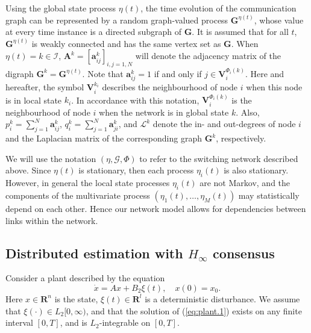 \documentclass[a4paper,twocolumn]{autart}
\begin{document}
Using the global state process $\eta(t)$, the time evolution of the
communication graph can be represented by a random graph-valued process
$\mathbf{G}^{\eta(t)}$, whose value at every time instance is a directed
subgraph of $\mathbf{G}$. It is assumed that for all $t$,
$\mathbf{G}^{\eta(t)}$ is weakly connected and has the same vertex set as
$\mathbf{G}$. When $\eta(t)=k\in\mathcal{I}$, 
$\mathbf{A}^k=[\mathbf{a}_{ij}^k]_{i,j=1,N}$ will denote the adjacency
matrix of the digraph $\mathbf{G}^k=\mathbf{G}^{\eta(t)}$. Note that
$\mathbf{a}_{ij}^k=1$ if and only if $j\in \mathbf{V}_i^{\Phi_i(k)}$. Here
and hereafter, the symbol $\mathbf{V}_i^{k_i}$ describes the neighbourhood
of node $i$ when this node is in local state $k_i$. In accordance with
this notation, $\mathbf{V}_i^{\Phi_i(k)}$ is the neighbourhood
of node $i$ when the network is in global state $k$. Also,  
$p_i^k=\sum_{j=1}^{N}\mathbf{a}_{ij}^k$, 
$q_i^k=\sum_{j=1}^{N}\mathbf{a}_{ji}^k$, and $\mathcal{L}^k$ denote the
in- and out-degrees of node $i$ and the Laplacian matrix of the
corresponding graph $\mathbf{G}^k$, respectively.    


We will use the notation $(\eta,\mathcal{G},\Phi)$ to refer to the
switching network described above. Since $\eta(t)$ is 
stationary, then each 
process $\eta_i(t)$ is also stationary. However, in general the local state
processes $\eta_i(t)$ are not Markov, and the components of the
multivariate process $(\eta_1(t),\ldots, \eta_M(t))$ may statistically
depend on each other. Hence our network model allows for
dependencies between links within the network. 

  
\subsection{Distributed estimation with $H_\infty$
  consensus}
Consider a plant described by the equation
\begin{equation}
  \label{eq:plant.1}
  \dot x=Ax+B_2 \xi(t), \quad x(0)=x_0.
\end{equation}
Here $x\in\mathbf{R}^n$ is the state, $\xi(t)\in\mathbf{R}^l$ is a deterministic
disturbance. We assume that $\xi(\cdot)\in
L_2[0,\infty)$, and that the solution of (\ref{eq:plant.1})
exists on any finite interval $[0,T]$, and is $L_2$-integrable on
$[0,T]$. 
\end{document}
